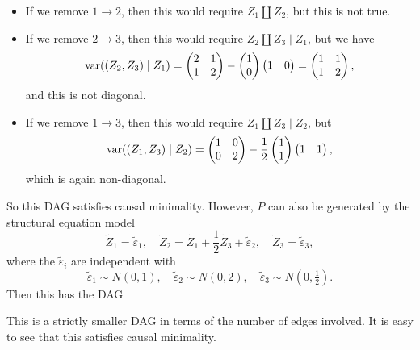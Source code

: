 \documentclass[a4paper]{article}
\begin{document}
\begin{itemize}
  \item If we remove $1 \to 2$, then this would require $Z_1 \amalg Z_2$, but this is not true.
  \item If we remove $2 \to 3$, then this would require $Z_2 \amalg Z_3 \mid Z_1$, but we have
    \[
      \operatorname{var}((Z_2, Z_3) \mid Z_1) =
      \begin{pmatrix}
        2 & 1\\
        1 & 2
      \end{pmatrix} -
      \begin{pmatrix}
        1 \\0
      \end{pmatrix}
      \begin{pmatrix}
        1 & 0
      \end{pmatrix} =
      \begin{pmatrix}
        1 & 1\\
        1 & 2
      \end{pmatrix},
    \]
    and this is not diagonal.
  \item If we remove $1 \to 3$, then this would require $Z_1 \amalg Z_3 \mid Z_2$, but
    \[
     \operatorname{var}((Z_1, Z_3) \mid Z_2) =
     \begin{pmatrix}
       1 & 0 \\
       0 & 2
     \end{pmatrix} -
     \frac{1}{2}
     \begin{pmatrix}
       1 \\ 1
     \end{pmatrix}
     \begin{pmatrix}
       1 & 1
     \end{pmatrix},
   \]
   which is again non-diagonal.
\end{itemize}
So this DAG satisfies causal minimality. However, $P$ can also be generated by the structural equation model
\[
  \tilde{Z}_1 = \tilde{\varepsilon}_1,\quad \tilde{Z}_2 = \tilde{Z}_1 + \frac{1}{2} \tilde{Z}_3 + \tilde{\varepsilon}_2,\quad \tilde{Z}_3 = \tilde{\varepsilon}_3,
\]
where the $\tilde{\varepsilon}_i$ are independent with
\[
  \tilde{\varepsilon}_1 \sim N(0, 1),\quad \tilde{\varepsilon}_2 \sim N(0, 2),\quad \tilde{\varepsilon}_3 \sim N(0, \tfrac{1}{2}).
\]
Then this has the DAG
\begin{center}
\end{center}
This is a strictly smaller DAG in terms of the number of edges involved. It is easy to see that this satisfies causal minimality.
\end{document}
